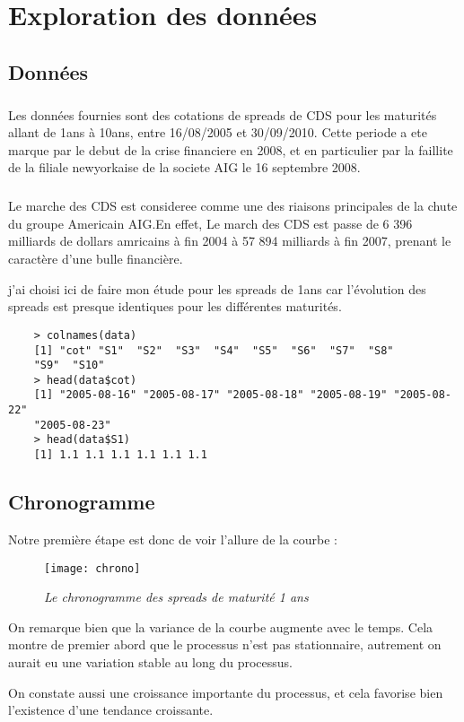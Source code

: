 \section{Exploration des données} 
    \subsection{Données}
    \subparagraph{} Les données fournies sont des cotations de spreads de CDS pour les maturités
    allant de 1ans à 10ans, entre 16/08/2005 et
    30/09/2010. 
    Cette periode a ete marque par le debut de la crise financiere en 2008, et en
    particulier par la faillite de la filiale newyorkaise de la societe AIG le 16
    septembre 2008. 
    \subparagraph{}
    Le marche des CDS est consideree comme une des riaisons principales de la chute
    du groupe Americain AIG.En effet, Le march des CDS est passe de 6 396 milliards de dollars
    amricains à fin 2004 à 57 894 milliards à fin 2007, prenant le caractère d'une
    bulle financière.


    j'ai choisi ici de faire mon étude pour les spreads de 1ans car l'évolution des
    spreads est presque identiques pour les différentes maturités.

    \begin{verbatim}
    > colnames(data)
    [1] "cot" "S1"  "S2"  "S3"  "S4"  "S5"  "S6"  "S7"  "S8"
    "S9"  "S10"
    > head(data$cot)
    [1] "2005-08-16" "2005-08-17" "2005-08-18" "2005-08-19" "2005-08-22"
    "2005-08-23"
    > head(data$S1)
    [1] 1.1 1.1 1.1 1.1 1.1 1.1
    \end{verbatim}

    \subsection{Chronogramme} 
    Notre première étape est donc de voir l'allure de la courbe :
    \begin{figure}[H]
        \centering
        \label{fig:chrono} 
        \texttt{[image: chrono]} 
        \caption{\it Le chronogramme des spreads de maturité 1 ans } 
    \end{figure}

    On remarque bien que la variance de la courbe augmente avec le temps. Cela
    montre de premier abord que le processus n'est pas stationnaire, autrement
    on aurait eu une variation stable au long du processus.

    On constate aussi une croissance importante du processus, et cela favorise bien
    l'existence d'une tendance croissante.


